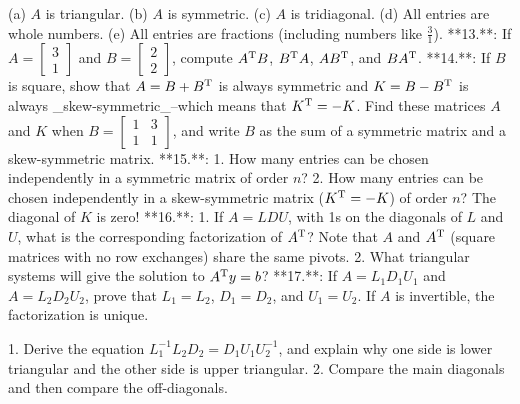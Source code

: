 (a) \(A\) is triangular. (b) \(A\) is symmetric. (c) \(A\) is tridiagonal. (d) All entries are whole numbers. (e) All entries are fractions (including numbers like \(\frac{3}{1}\)).
**13.**: If \(A=[\begin{smallmatrix}3\\ 1\end{smallmatrix}]\) and \(B=[\begin{smallmatrix}2\\ 2\end{smallmatrix}]\), compute \(A^{\rm T}B\), \(B^{\rm T}A\), \(AB^{\rm T}\), and \(BA^{\rm T}\).
**14.**: If \(B\) is square, show that \(A=B+B^{\rm T}\) is always symmetric and \(K=B-B^{\rm T}\) is always _skew-symmetric_--which means that \(K^{\rm T}=-K\). Find these matrices \(A\) and \(K\) when \(B=[\begin{smallmatrix}1&3\\ 1&1\end{smallmatrix}]\), and write \(B\) as the sum of a symmetric matrix and a skew-symmetric matrix.
**15.**:
1. How many entries can be chosen independently in a symmetric matrix of order \(n\)?
2. How many entries can be chosen independently in a skew-symmetric matrix (\(K^{\rm T}=-K\)) of order \(n\)? The diagonal of \(K\) is zero!
**16.**:
1. If \(A=LDU\), with 1s on the diagonals of \(L\) and \(U\), what is the corresponding factorization of \(A^{\rm T}\)? Note that \(A\) and \(A^{\rm T}\) (square matrices with no row exchanges) share the same pivots.
2. What triangular systems will give the solution to \(A^{\rm T}y=b\)?
**17.**: If \(A=L_{1}D_{1}U_{1}\) and \(A=L_{2}D_{2}U_{2}\), prove that \(L_{1}=L_{2}\), \(D_{1}=D_{2}\), and \(U_{1}=U_{2}\). If \(A\) is invertible, the factorization is unique.

1. Derive the equation \(L_{1}^{-1}L_{2}D_{2}=D_{1}U_{1}U_{2}^{-1}\), and explain why one side is lower triangular and the other side is upper triangular.
2. Compare the main diagonals and then compare the off-diagonals.

 